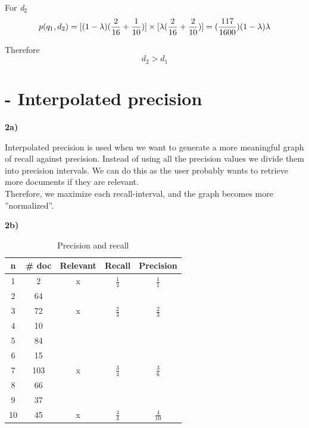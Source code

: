 \documentclass[a4paper, norsk, 11pt]{scrartcl} %
\numberwithin{equation}{section} %
\numberwithin{figure}{section} %
\numberwithin{table}{section} %
\begin{document}
For \textit{d$_2$}
\begin{equation*}
p(q_1, d_2) =[(1 - \lambda)({2 \over 16} + {1 \over 10}) ] \times [\lambda ({2 \over 16} + {2 \over 10}) ] = ({117 \over 1600}) (1 - \lambda) \lambda
\end{equation*}

Therefore
\begin{equation*}
d_2 > d_1
\end{equation*}


\newpage

\section{- Interpolated precision}

\textbf{2a)}

Interpolated precision is used when we want to generate a more meaningful graph of recall against precision. Instead of using all the precision values we divide them into precision intervals. We can do this as the user probably wants to retrieve more documents if they are relevant.\\
Therefore, we maximize each recall-interval, and the graph becomes more ''normalized''.


\vspace{22pt}



\textbf{2b)}

\begin{table}[ht]
\centering
\begin{tabular}{c c c c c}
\hline
n & \# doc & Relevant & Recall & Precision \\ [0.5ex]
\hline
1 & 2 & x & $\frac{1}{4}$ & $\frac{1}{1}$  \\  
2 & 64 &  & &  \\  
3 & 72 & x & $\frac{2}{4}$ & $\frac{2}{3}$  \\  
4 & 10 &  & &  \\  
5 & 84 &  & &  \\  
6 & 15 &  & &  \\  
7 & 103 & x & $\frac{3}{4}$ & $\frac{3}{6}$  \\  
8 & 66 &  & &  \\  
9 & 37 &  & &  \\  
10 & 45 & x & $\frac{4}{4}$ & $\frac{4}{10}$  \\  
\hline
\end{tabular}
\caption{Precision and recall}
\label{prt}
\end{table}
\end{document}

